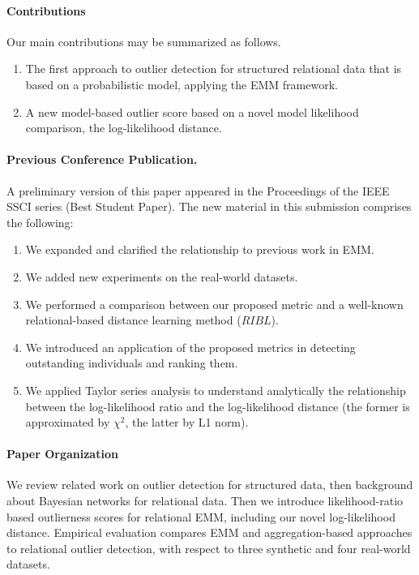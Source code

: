 {\paragraph{Contributions} Our main contributions may be 
summarized as follows.

\begin{enumerate} 
	\item The first approach to outlier detection for structured relational data that is based on a probabilistic model, applying the EMM framework.
	\item A new model-based outlier score based on a novel model likelihood comparison, the log-likelihood distance.  %
\end{enumerate}
				
				\paragraph{Previous Conference Publication.} A preliminary version of this paper appeared in the Proceedings of the IEEE SSCI series \citep{Riahi2015} (Best Student Paper). The new material in this submission comprises the following:
				
				\begin{enumerate} 
				\item We expanded and clarified the relationship to previous work in EMM.
					\item We added new experiments on the real-world datasets.
					\item We performed a comparison between our proposed metric and a well-known relational-based distance learning method ($\textit{RIBL}$).
					\item We introduced an application of the proposed metrics in detecting outstanding individuals and ranking them.
					\item We applied Taylor series analysis to understand analytically the relationship between the log-likelihood ratio and the log-likelihood distance (the former is approximated by $\chi^{2}$, the latter by L1 norm). 
				\end{enumerate}

\paragraph{Paper Organization} We review related work on outlier detection for structured data, then background about Bayesian networks for relational data. Then we introduce likelihood-ratio based outlierness scores for relational EMM, including our novel log-likelihood distance. 
Empirical evaluation compares EMM and aggregation-based approaches to relational outlier detection, with respect to three synthetic and four real-world datasets.

}
